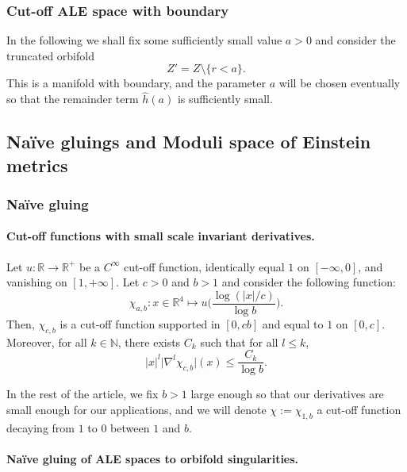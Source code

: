 \documentclass[12pt]{article}
\begin{document}
\subsubsection{Cut-off ALE space with boundary}

In the following we shall fix some sufficiently small value $a > 0$ and consider the truncated orbifold
\begin{equation}
Z' = Z \setminus \{ r < a\}.
\label{truncorb}
\end{equation}
This is a manifold with boundary, and the parameter $a$ will be chosen eventually so that the remainder term
$\hat{h}(a)$ is sufficiently small.

\subsection{Naïve gluings and Moduli space of Einstein metrics}


\subsubsection{Naïve gluing}

\paragraph{Cut-off functions with small scale invariant derivatives.}


Let $u: \mathbb{R}\to\mathbb{R}^+$ be a $C^\infty$ cut-off function, identically equal $1$ on $[-\infty,0]$, and vanishing on $[1,+\infty]$. Let $c>0$ and $b>1$ and consider the following function:
    \begin{equation}
        \chi_{a,b}:x\in \mathbb{R}^4\mapsto u\Big(\frac{\log(|x|/c)}{\log b}\Big).\label{cut-off low derivative}
    \end{equation}
    Then, $\chi_{c,b}$ is a cut-off function supported in $[0,cb]$ and equal to $1$ on $[0,c]$. Moreover, for all $k\in \mathbb{N}$, there exists $C_k$ such that for all $l\leqslant k$,
    $$|x|^l\big| \nabla^l\chi_{c,b} \big|(x)\leqslant \frac{C_k}{\log b}.$$

In the rest of the article, we fix $b>1$ large enough so that our derivatives are small enough for our applications, and we will denote $\chi:= \chi_{1,b}$ a cut-off function decaying from $1$ to $0$ between $1$ and $b$.

\paragraph{Naïve gluing of ALE spaces to orbifold singularities.}
\end{document}
